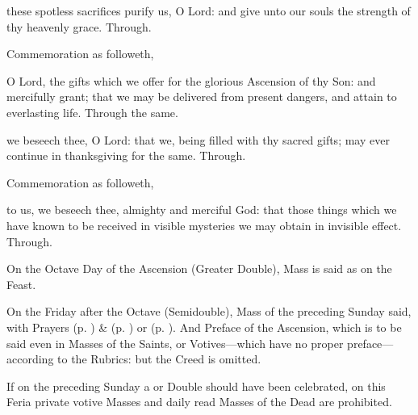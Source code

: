 \secret
{} these spotless sacrifices purify us, O Lord: and give unto our souls the strength of thy heavenly grace. Through.


\begin{rubric}
	Commemoration  as followeth,
\end{rubric}
 O Lord, the gifts which we offer for the glorious Ascension of thy Son: and mercifully grant; that we may be delivered from present dangers, and attain to everlasting life. Through the same.

\postcommunion
{} we beseech thee, O Lord: that we, being filled with thy sacred gifts; may ever continue in thanksgiving for the same. Through.


\begin{rubric}
	Commemoration  as followeth,
\end{rubric}
 to us, we beseech thee, almighty and merciful God: that those things which we have known to be received in visible mysteries we may obtain in invisible effect. Through.
\begin{rubric}
    On the Octave Day of the Ascension (Greater Double), Mass is said as on the Feast.
\end{rubric}
\begin{rubric}
    On the Friday after the Octave (Semidouble), Mass of the preceding Sunday said, with  Prayers  (p. \pageref{SPMaryInEaster}) \&  (p. \pageref{SPAgainst}) or  (p. \pageref{SPChiefBishop}). And Preface of the Ascension, which is to be said even in Masses of the Saints, or Votives---which have no proper preface---according to the Rubrics: but the Creed is omitted.
\end{rubric}
\begin{rubric}
    If on the preceding Sunday a  or  Double should have been celebrated, on this Feria private votive Masses and daily read Masses of the Dead are prohibited.
\end{rubric}


